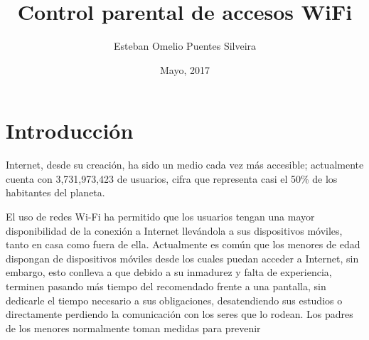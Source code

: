 \documentclass[12pt]{article}
\title{Control parental de accesos WiFi}
\author{Esteban Omelio Puentes Silveira}
\date{Mayo, 2017}
\begin{document}
\maketitle


\clearpage



\renewcommand\contentsname{Índice}
\tableofcontents
\printindex


\section{Introducción}

Internet, desde su creación, ha sido un medio cada vez más accesible; actualmente cuenta con 3,731,973,423 de usuarios, cifra que representa casi el 50\% de los habitantes del planeta. 

El uso de redes Wi-Fi ha permitido que los usuarios tengan una mayor disponibilidad de la conexión a Internet llevándola a sus dispositivos móviles, tanto en casa como fuera de ella. Actualmente es común que los menores de edad dispongan de dispositivos móviles desde los cuales puedan acceder a Internet, sin embargo, esto conlleva a que debido a su inmadurez y falta de experiencia, terminen pasando más tiempo del recomendado frente a una pantalla, sin dedicarle el tiempo necesario a sus obligaciones, desatendiendo sus estudios o directamente perdiendo la comunicación con los seres que lo rodean. Los padres de los menores normalmente toman medidas para prevenir 




\end{document}
